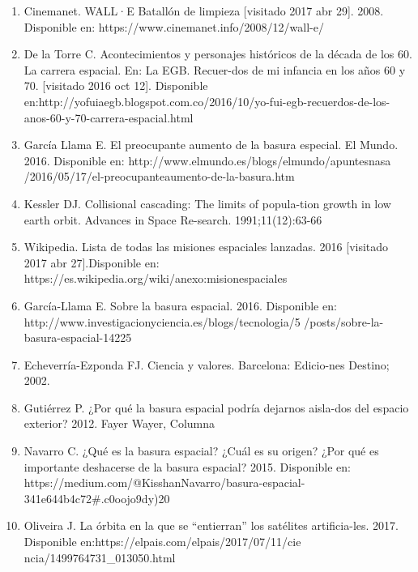\documentclass[12pt,letterpaper]{article}
\begin{document}
\begin{multicols}{2}
\begin{enumerate}
    \item {\scriptsize Cinemanet. WALL·E Batallón de limpieza [visitado 2017 abr 29]. 2008. Disponible en: https://www.cinemanet.info/2008/12/wall-e/}
    
    \item {\scriptsize De la Torre C. Acontecimientos y personajes históricos de la década  de  los  60.  La  carrera  espacial.  En:  La  EGB.  Recuer-dos de mi infancia en los años 60 y 70. [visitado 2016 oct 12]. Disponible  en:http://yofuiaegb.blogspot.com.co/2016/10/yo-fui-egb-recuerdos-de-los-anos-60-y-70-carrera-espacial.html}
    
    \item {\scriptsize García Llama E. El preocupante aumento de la basura especial. El Mundo. 2016. Disponible en: http://www.elmundo.es/blogs/elmundo/apuntesnasa
    /2016/05/17/el-preocupanteaumento-de-la-basura.htm}
    
    \item {\scriptsize Kessler   DJ.   Collisional   cascading:   The   limits   of   popula-tion  growth  in  low  earth  orbit.  Advances  in  Space  Re-search. 1991;11(12):63-66}
    
    \item {\scriptsize Wikipedia. Lista de todas las misiones espaciales lanzadas. 2016 [visitado 2017 abr 27].Disponible en: 
    https://es.wikipedia.org/wiki/anexo:misionespaciales}

    \item {\scriptsize García-Llama E. Sobre la basura espacial. 2016. Disponible en: http://www.investigacionyciencia.es/blogs/tecnologia/5
    /posts/sobre-la-basura-espacial-14225}
    
    \item {\scriptsize Echeverría-Ezponda FJ. Ciencia y valores. Barcelona: Edicio-nes Destino; 2002.}
    
    \item {\scriptsize Gutiérrez P. ¿Por qué la basura espacial podría dejarnos aisla-dos del espacio exterior? 2012. Fayer Wayer, Columna}
    
    \item {\scriptsize Navarro  C.  ¿Qué  es  la  basura  espacial?  ¿Cuál  es  su  origen?  ¿Por qué es importante deshacerse de la basura espacial? 2015. Disponible en: https://medium.com/@KisshanNavarro/basura-espacial-341e644b4c72#.c0oojo9dy)20}
   
    \item {\scriptsize Oliveira J. La órbita en la que se “entierran” los satélites artificia-les. 2017.  Disponible en:https://elpais.com/elpais/2017/07/11/cie
    ncia/1499764731_013050.html}
    

\end{enumerate}
\end{multicols}
\end{document}
